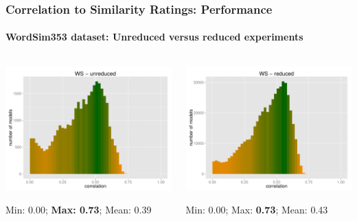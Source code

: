 \documentclass[t]{beamer} %
\begin{document}
\begin{frame}
  \frametitle{Correlation to Similarity Ratings: Performance}
  \framesubtitle{WordSim353 dataset: Unreduced versus reduced experiments}
  \centering
  
  \begin{columns}

    \begin{column}{0.5\textwidth}
      \centering
      \hspace*{-18pt} \includegraphics[scale=0.30]{img/lapesa_hist_ws_unreduced}
      \begin{block}{}\footnotesize \centering
        Min:  0.00; \textbf{Max:  0.73};  Mean: 0.39
      \end{block}
    \end{column}
    \begin{column}{0.5\textwidth}
      \hspace*{-18pt} 
      \includegraphics[scale=0.30]{img/lapesa_hist_ws_reduced}
      \begin{block}{}\footnotesize \centering
        Min:  0.00; Max: \textbf{0.73};  Mean: 0.43
      \end{block}
    \end{column}
  \end{columns}  
\end{frame}
\end{document}
